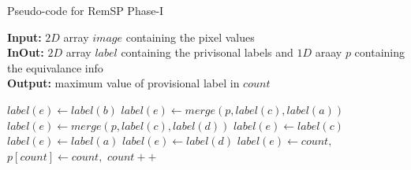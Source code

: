 \clearpage
\begin{algorithm}[h]
\small
{
	\caption{Pseudo-code for RemSP Phase-I}
	\label{alg:RemSP-I}
	\textbf{Input:} $2D$ array $image$ containing the pixel values \\
	\textbf{InOut:} $2D$ array $label$ containing the privisonal labels and $1D$ araay $p$ containing the equivalance info\\
	\textbf{Output:} maximum value of provisional label in $count$
	\begin{algorithmic}[1]
						\State $label(e) \gets label(b)$
					\Else
								\State $label(e) \gets merge(p,label(c),label(a))$
							\Else
									\State $label(e) \gets merge(p,label(c),label(d))$
								\Else
									\State $label(e) \gets label(c)$
								\EndIf
							\EndIf
						\Else
								\State $label(e) \gets label(a)$
							\Else
									\State $label(e) \gets label(d)$
								\Else
									\State $label(e) \gets count,$
									\State $p[count] \gets count,$
									\State $count++$
								\EndIf
							\EndIf
						\EndIf
					\EndIf
				\EndIf
			\EndFor
		\EndFor
		\State {}
	\EndFunction
	\end{algorithmic}
}	
\end{algorithm}

